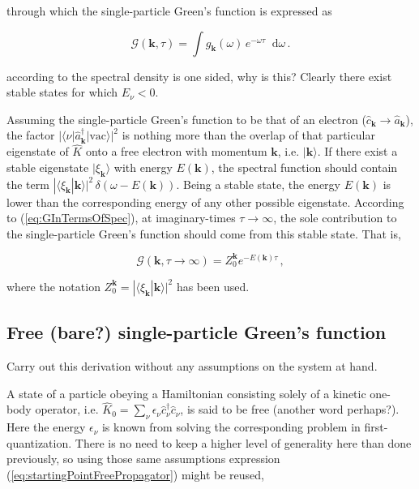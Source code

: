 \documentclass[12pt]{report}
\renewcommand{\vec}[1]{\boldsymbol{\mathbf{#1}}}                        %
\newcommand*\diff{\mathop{}\!\mathrm{d}}
\newcommand{\Gt}{\mathcal{G}}
\newcommand{\question}[1]{{\leavevmode\color{question}#1}}
\newcommand{\todo}[1]{{\leavevmode\color{todo}#1}}
\begin{document}
through which the single-particle Green's function is expressed as

\begin{equation}
	\label{eq:GInTermsOfSpec}
	\Gt(\vec k, \tau) = \int g_{\vec k} (\omega) \, e^{- \omega \tau} \diff \omega \,.
\end{equation}

\question{according to \cite{MishchenkoA.2000DqMC} the spectral density is one sided, why is this? Clearly there exist stable states for which $ E_\nu < 0 $.}

Assuming the single-particle Green's function to be that of an electron ($ \hat c_{\vec k} \rightarrow \hat a_{\vec k} $), the factor $ | \langle \nu | \hat a^\dagger_{\vec k} | \text{vac} \rangle |^2 $ is nothing more than the overlap of that particular eigenstate of $ \hat K $ onto a free electron with momentum $ \vec k $, i.e. $ | \vec k \rangle $. If there exist a stable eigenstate $  | \xi_{\vec k} \rangle $ with energy $ E(\vec k) $, the spectral function should contain the term $ | \langle \xi_{\vec k} | \vec k \rangle |^2 \, \delta(\omega - E(\vec k)) $. Being a stable state, the energy $ E(\vec k) $ is lower than the corresponding energy of any other possible eigenstate. According to (\ref{eq:GInTermsOfSpec}), at imaginary-times $ \tau \rightarrow \infty $, the sole contribution to the single-particle Green's function should come from this stable state. That is,

\begin{equation}
	\Gt(\vec k, \tau \rightarrow \infty) = Z_0^{\vec k} e^{- E(\vec k) \tau} \,,
\end{equation}

where the notation $ Z_0^{\vec k} = | \langle \xi_{\vec k} | \vec k \rangle |^2 $ has been used.

\subsection{Free \question{(bare?)} single-particle Green's function}

\todo{Carry out this derivation without any assumptions on the system at hand.}

A state of a particle obeying a Hamiltonian consisting solely of a kinetic one-body operator, i.e. $ \hat K_0 = \sum_\nu \epsilon_\nu \hat c^\dagger_\nu \hat c_\nu $, is said to be free \question{(another word perhaps?)}. Here the energy $ \epsilon_\nu $ is known from solving the corresponding problem in first-quantization. There is no need to keep a higher level of generality here than done previously, so using those same assumptions expression (\ref{eq:startingPointFreePropagator}) might be reused,
\end{document}
